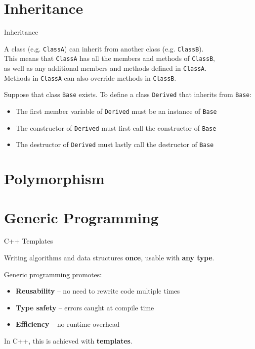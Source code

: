 \section{Inheritance}
\begin{frame}[fragile]{Inheritance}
  \begin{sqt:definition}
    A class (e.g. \verb|ClassA|) can inherit from another class (e.g. \verb|ClassB|).\\
    This means that \verb|ClassA| has all the members and methods of \verb|ClassB|,\\
    as well as any additional members and methods defined in \verb|ClassA|.\\
    Methods in \verb|ClassA| can also override methods in \verb|ClassB|.
  \end{sqt:definition}

  Suppose that class \verb|Base| exists.
  To define a class \verb|Derived| that inherits from \verb|Base|:
  \begin{itemize}
    \item The first member variable of \verb|Derived| must be an instance of \verb|Base|
    \item The constructor of \verb|Derived| must first call the constructor of \verb|Base|
    \item The destructor of \verb|Derived| must lastly call the destructor of \verb|Base|
  \end{itemize}
\end{frame}

\section{Polymorphism}

\section{Generic Programming}

\begin{frame}{C++ Templates}
  \begin{sqt:definition}
    Writing algorithms and data structures \textbf{once}, usable with \textbf{any type}.
  \end{sqt:definition}

  Generic programming promotes:
  \begin{itemize}
    \item \textbf{Reusability} -- no need to rewrite code multiple times
    \item \textbf{Type safety} -- errors caught at compile time
    \item \textbf{Efficiency} -- no runtime overhead
  \end{itemize}

  In C++, this is achieved with \textbf{templates}.
\end{frame}


